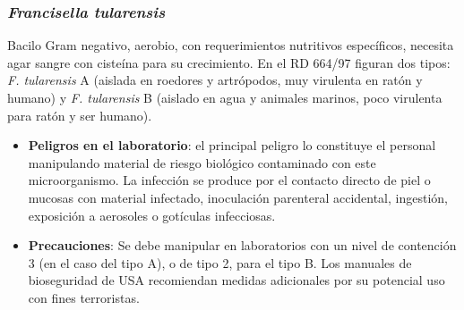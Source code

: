 \subsubsection{\textit{Francisella tularensis}}
Bacilo Gram negativo, aerobio, con requerimientos nutritivos específicos, necesita agar sangre con cisteína para su crecimiento. En el RD 664/97 figuran dos tipos: \textit{F. tularensis} A (aislada en roedores y artrópodos, muy virulenta en ratón y humano) y \textit{F. tularensis} B (aislado en agua y animales marinos, poco virulenta para ratón y ser humano).
\begin{itemize}[itemsep=0pt,parsep=0pt,topsep=0pt,partopsep=0pt]
    \item\textbf{Peligros en el laboratorio}: el principal peligro lo constituye el personal manipulando material de riesgo biológico contaminado con este microorganismo. La infección se produce por el contacto directo de piel o mucosas con material infectado, inoculación parenteral accidental, ingestión, exposición a aerosoles o gotículas infecciosas.
    \item\textbf{Precauciones}: Se debe manipular en laboratorios con un nivel de contención 3 (en el caso del tipo A), o de tipo 2, para el tipo B. Los manuales de bioseguridad de USA recomiendan medidas adicionales por su potencial uso con fines terroristas.
\end{itemize}
